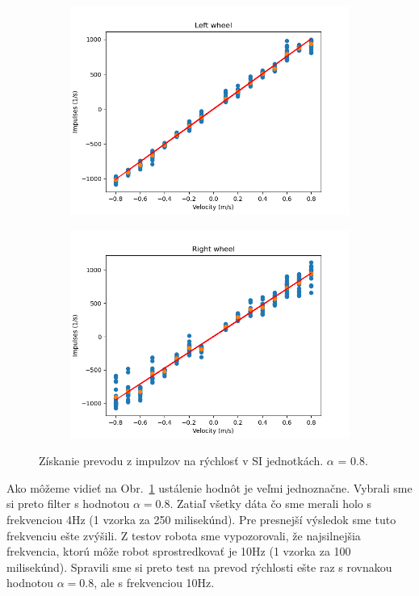 \begin{figure}[!htbp]
	\begin{subfigure}{0.5\textwidth}
		\includegraphics[width=\textwidth]{img/lw_08250.png}
	\end{subfigure}
	\hfill
	\begin{subfigure}{0.5\textwidth}
		\includegraphics[width=\textwidth]{img/rw_08250.png}
	\end{subfigure}
	\caption{Získanie prevodu z impulzov na rýchlosť v SI jednotkách. \(\alpha\) = 0.8.}
	\label{fig:rw_lw_08250}
\end{figure}

\newpage

Ako môžeme vidieť na Obr.~\ref{fig:rw_lw_08250} ustálenie hodnôt je veľmi jednoznačne. Vybrali sme si preto filter s hodnotou \(\alpha = 0.8\).
Zatiaľ všetky dáta čo sme merali holo s frekvenciou 4Hz (1 vzorka za 250 milisekúnd). Pre presnejší výsledok sme tuto frekvenciu ešte zvýšili.
Z testov robota sme vypozorovali, že najsilnejšia frekvencia, ktorú môže robot sprostredkovať je 10Hz (1 vzorka za 100 milisekúnd).
Spravili sme si preto test na prevod rýchlosti ešte raz s rovnakou hodnotou \(\alpha = 0.8\), ale s frekvenciou 10Hz.

